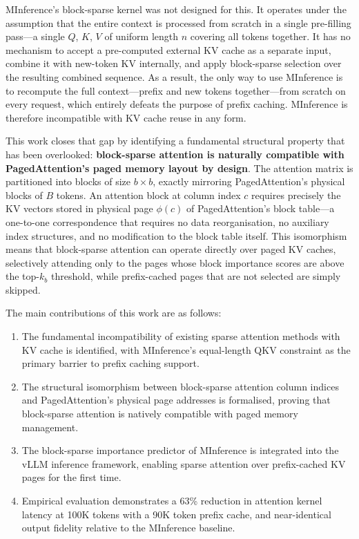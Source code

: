 \documentclass{article}
\begin{document}
MInference's block-sparse kernel was not designed for this. It operates
under the assumption that the entire context is processed from scratch in a
single pre-filling pass---a single $Q$, $K$, $V$ of uniform length $n$
covering all tokens together. It has no mechanism to accept a pre-computed
external KV cache as a separate input, combine it with new-token KV
internally, and apply block-sparse selection over the resulting combined
sequence. As a result, the only way to use MInference is to recompute the
full context---prefix and new tokens together---from scratch on every
request, which entirely defeats the purpose of prefix caching. MInference
is therefore incompatible with KV cache reuse in any form.

This work closes that gap by identifying a fundamental structural property
that has been overlooked: \textbf{block-sparse attention is naturally
compatible with PagedAttention's paged memory layout by design}. The
attention matrix is partitioned into blocks of size $b \times b$, exactly
mirroring PagedAttention's physical blocks of $B$ tokens. An attention
block at column index $c$ requires precisely the KV vectors stored in
physical page $\phi(c)$ of PagedAttention's block table---a one-to-one
correspondence that requires no data reorganisation, no auxiliary index
structures, and no modification to the block table itself. This isomorphism
means that block-sparse attention can operate directly over paged KV caches,
selectively attending only to the pages whose block importance scores are
above the top-$k_b$ threshold, while prefix-cached pages that are not
selected are simply skipped.

The main contributions of this work are as follows:
\begin{enumerate}
  \item The fundamental incompatibility of existing sparse attention methods
    with KV cache is identified, with MInference's equal-length QKV
    constraint as the primary barrier to prefix caching support.
  \item The structural isomorphism between block-sparse attention column
    indices and PagedAttention's physical page addresses is formalised,
    proving that block-sparse attention is natively compatible with paged
    memory management.
  \item The block-sparse importance predictor of MInference
    \cite{minference} is integrated into the vLLM inference framework,
    enabling sparse attention over prefix-cached KV pages for the first time.
  \item Empirical evaluation demonstrates a 63\% reduction in attention
    kernel latency at 100K tokens with a 90K token prefix cache, and
    near-identical output fidelity relative to the MInference baseline.
\end{enumerate}
\end{document}
